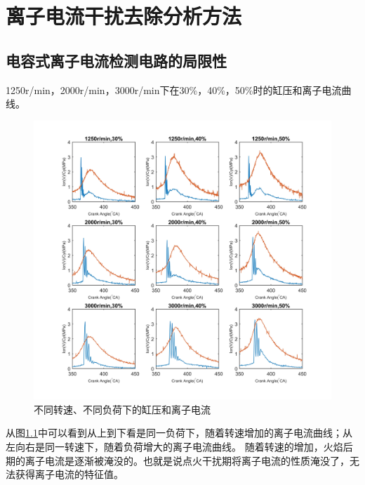 \chapter{离子电流干扰去除分析方法}
\section{电容式离子电流检测电路的局限性}
1250r/min，2000r/min，3000r/min下在30\%，40\%，50\%时的缸压和离子电流曲线。
\begin{figure}[H]
	\centering
	\includegraphics[width=\textwidth]{thesis_figure/ion_chapter/ion_vary_trending}
	\caption{不同转速、不同负荷下的缸压和离子电流}
	\label{fig:ion_cyp}
\end{figure}
从图\ref{fig:ion_cyp}中可以看到从上到下看是同一负荷下，随着转速增加的离子电流曲线；从左向右是同一转速下，随着负荷增大的离子电流曲线。
随着转速的增加，火焰后期的离子电流是逐渐被淹没的。也就是说点火干扰期将离子电流的性质淹没了，无法获得离子电流的特征值。
